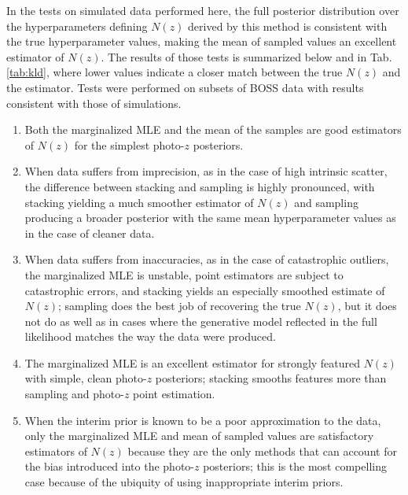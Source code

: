 \documentclass[preprint]{aastex}
\begin{document}
In the tests on simulated data performed here, the full posterior distribution 
over the hyperparameters defining $N(z)$ derived by this method is consistent 
with the true hyperparameter values, making the mean of sampled values an 
excellent estimator of $N(z)$.  The results of those tests is summarized below 
and in Tab. \ref{tab:kld}, where lower values indicate a closer match between 
the true $N(z)$ and the estimator.  Tests were performed on subsets of BOSS 
data with results consistent with those of simulations.

\begin{enumerate}
\item Both the marginalized MLE and the mean of the samples are good estimators 
of $N(z)$ for the simplest photo-$z$ posteriors.
\item When data suffers from imprecision, as in the case of high intrinsic 
scatter, the difference between stacking and sampling is highly pronounced, 
with stacking yielding a much smoother estimator of $N(z)$ and sampling 
producing a broader posterior with the same mean hyperparameter values as in 
the case of cleaner data.
\item When data suffers from inaccuracies, as in the case of catastrophic 
outliers, the marginalized MLE is unstable, point estimators are subject to 
catastrophic errors, and stacking yields an especially smoothed estimate of 
$N(z)$; sampling does the best job of recovering the true $N(z)$, but it does 
not do as well as in cases where the generative model reflected in the full 
likelihood matches the way the data were produced.
\item The marginalized MLE is an excellent estimator for strongly featured 
$N(z)$ with simple, clean photo-$z$ posteriors; stacking smooths features more 
than sampling and photo-$z$ point estimation.
\item When the interim prior is known to be a poor approximation to the data, 
only the marginalized MLE and mean of sampled values are satisfactory 
estimators of $N(z)$ because they are the only methods that can account for the 
bias introduced into the photo-$z$ posteriors; this is the most compelling case 
because of the ubiquity of using inappropriate interim priors.
\end{enumerate}
\end{document}
